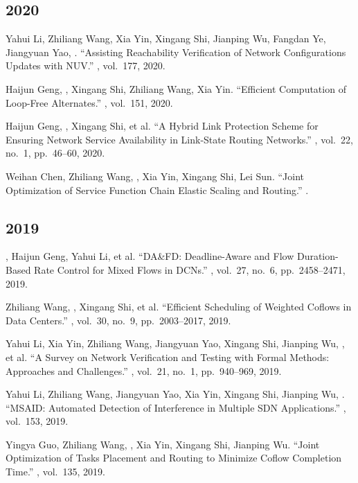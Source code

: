 \documentclass[11pt]{article}
\begin{document}
\subsection*{2020}
\begin{publist}
\item Yahui Li, Zhiliang Wang\corr, Xia Yin, Xingang Shi, Jianping Wu, Fangdan Ye,
Jiangyuan Yao, . ``Assisting Reachability Verification of Network
Configurations Updates with NUV.'' , vol.~177, 2020.
\item Haijun Geng, , Xingang Shi\corr, Zhiliang Wang, Xia Yin.
``Efficient Computation of Loop-Free Alternates.'' , vol.~151, 2020.
\item Haijun Geng, , Xingang Shi\corr, et al. ``A Hybrid Link Protection
Scheme for Ensuring Network Service Availability in Link-State Routing Networks.''
, vol.~22, no.~1, pp.~46--60, 2020.
\item Weihan Chen, Zhiliang Wang, , Xia Yin, Xingang Shi, Lei Sun.
``Joint Optimization of Service Function Chain Elastic Scaling and Routing.''
.
\end{publist}

\subsection*{2019}
\begin{publist}
\item {}, Haijun Geng, Yahui Li, et al. ``DA\&FD: Deadline-Aware and Flow
Duration-Based Rate Control for Mixed Flows in DCNs.'' , vol.~27, no.~6, pp.~2458--2471, 2019.
\item Zhiliang Wang, \corr, Xingang Shi, et al. ``Efficient Scheduling of
Weighted Coflows in Data Centers.'' , vol.~30, no.~9, pp.~2003--2017, 2019.
\item Yahui Li, Xia Yin, Zhiliang Wang\corr, Jiangyuan Yao, Xingang Shi, Jianping Wu,
, et al. ``A Survey on Network Verification and Testing with Formal
Methods: Approaches and Challenges.'' , vol.~21, no.~1, pp.~940--969, 2019.
\item Yahui Li, Zhiliang Wang\corr, Jiangyuan Yao, Xia Yin, Xingang Shi, Jianping Wu,
. ``MSAID: Automated Detection of Interference in Multiple SDN
Applications.'' , vol.~153, 2019.
\item Yingya Guo, Zhiliang Wang\corr, , Xia Yin, Xingang Shi, Jianping
Wu. ``Joint Optimization of Tasks Placement and Routing to Minimize Coflow Completion
Time.'' , vol.~135, 2019.
\end{publist}
\end{document}
